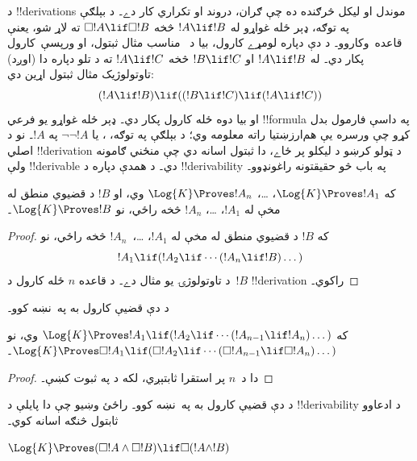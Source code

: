 \documentclass[../../../include/open-logic-section]{subfiles}
\begin{document}


د !!{derivation}s موندل او ليکل څرګنده ده چې ګران، دروند او تکراري کار
دے۔ د بېلګې په توګه، ډېر ځله غواړو له $!A \lif !B$ څخه
$\Box !A \lif \Box !B$ ته لاړ شو، يعنې قاعده~\RK وکاروو۔ د دې دپاره
لومړے \Nec کارول، بيا د~ مناسب مثال ثبتول، او ورپسې~\MP کارول
پکار دي۔ له $!A \lif !B$ او $!B \lif !C$ څخه $!A \lif !C$ ته د تلو
دپاره دا (اوږد) تاوتولوژيک مثال ثبتول اړين دي:
\[
(!A \lif !B) \lif ((!B \lif !C) \lif (!A \lif !C))
\]
او بيا \MP{} دوه ځله کارول پکار دي۔ ډېر ځله غواړو يو فرعي
!!{formula} په داسې فارمول بدل کړو چې ورسره يې هم‌ارزښتيا راته معلومه
وي؛ د بېلګې په توګه، ، يا
$\lnot\lnot !A$ په $!A$۔ نو د اصلي !!{derivation} د ټولو کرښو د ليکلو
پر ځاے، دا ثبتول اسانه دي چې منځني ګامونه ولې !!{derivable} دي۔ د همدې
دپاره د !!{derivability} په باب څو حقيقتونه راغونډوو۔

\begin{prop}
  که $\Log{K} \Proves !A_1$، \dots، $\Log{K} \Proves !A_n$ وي، او
  $!B$ د قضيوي منطق له مخې له $!A_1$، \dots، $!A_n$ څخه راځي، نو
  $\Log{K} \Proves !B$۔
\end{prop}

\begin{proof}
  که $!B$ د قضيوي منطق له مخې له $!A_1$، \dots،~$!A_n$ څخه راځي، نو
  \[
  !A_1 \lif (!A_2 \lif \cdots (!A_n \lif !B)\dots)
  \]
  د تاوتولوژۍ يو مثال دے۔ د \MP{} قاعده $n$ ځله کارول د~$!B$
  !!{derivation} راکوي۔
\end{proof}

د دې قضيې کارول به په~\PL نښه کوو۔

\begin{prop}
  که $\Log{K} \Proves !A_1 \lif (!A_2 \lif \cdots (!A_{n-1} \lif
  !A_n)\dots)$ وي، نو $\Log{K} \Proves \Box !A_1 \lif (\Box !A_2 \lif
  \cdots (\Box !A_{n-1} \lif \Box !A_n)\dots)$۔
\end{prop}

\begin{proof}
  دا د~$n$ پر استقرا ثابتېږي، لکه د  په ثبوت کښې۔
\end{proof}

د دې قضيې کارول به په~\RK نښه کوو۔ راځئ وښيو چې دا پايلې د
!!{derivability} د ادعاوو ثابتول څنګه اسانه کوي۔

\begin{prop}
  $\Log{K} \Proves (\Box!A \land \Box!B) \lif \Box (!A \land !B)$
\end{prop}
\end{document}
